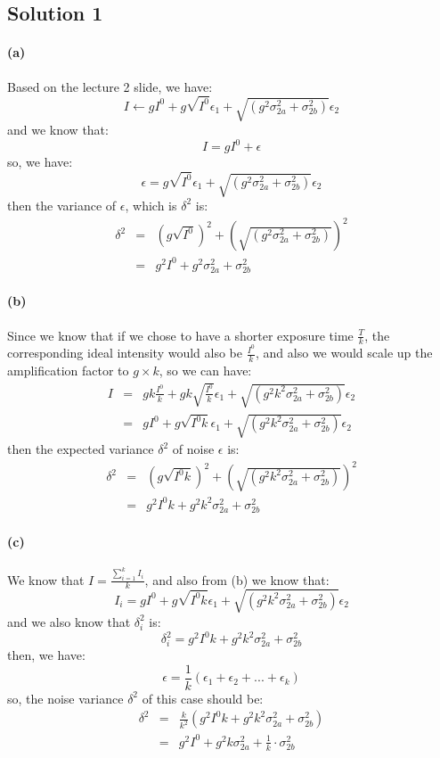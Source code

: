 \documentclass{article}
\newcommand{\solution}[1]{\clearpage \subsection*{Solution #1}}
\newcommand{\spart}[1]{\paragraph{(#1)}}
\begin{document}

\solution{1} 

\spart{a}Based on the lecture 2 slide, we have:
$$
I \leftarrow gI^0 + g\sqrt{I^0}\epsilon_1 + \sqrt{(g^2\sigma^2_{2a} + \sigma^2_{2b})}\epsilon_2
$$
and we know that:
$$
I = gI^0 + \epsilon
$$
so, we have:
$$
\epsilon= g\sqrt{I^0}\epsilon_1 + \sqrt{(g^2\sigma^2_{2a} + \sigma^2_{2b})}\epsilon_2
$$
then the variance of $\epsilon$, which is $\delta^2$ is:
\begin{eqnarray*}
\delta^2 & = & (g\sqrt{I^0})^2 + (\sqrt{(g^2\sigma^2_{2a} + \sigma^2_{2b})})^2 \\
              & = & g^2I^0 + g^2\sigma^2_{2a} + \sigma^2_{2b}
\end{eqnarray*}

\spart{b}Since we know that if we chose to have a shorter exposure time $\frac{T}{k}$, the corresponding ideal intensity would also be $\frac{I^0}{k}$, and also we would scale up the amplification factor to $g \times k$, so we can have:
\begin{eqnarray*}
I & = & gk\frac{I^0}{k} + gk\sqrt{\frac{I^0}{k}}\epsilon_1 + \sqrt{({g}^2{k}^2\sigma^2_{2a} + \sigma^2_{2b})}\epsilon_2 \\
  & = & gI^0 + g\sqrt{I^0k }\epsilon_1 + \sqrt{({g}^2{k}^2\sigma^2_{2a} + \sigma^2_{2b})}\epsilon_2
\end{eqnarray*}
then the expected variance $\delta^2$ of noise $\epsilon$ is:
\begin{eqnarray*}
\delta^2 & = & (g\sqrt{I^0k })^2 + (\sqrt{({g}^2{k}^2\sigma^2_{2a} + \sigma^2_{2b})})^2 \\
              & = & g^2I^0k + g^2k^2\sigma^2_{2a} + \sigma^2_{2b}
\end{eqnarray*}

\spart{c}We know that $I = \frac{\sum^k_{i=1}I_i}{k}$, and also from (b) we know that:
$$
I_i = gI^0 + g\sqrt{I^0k }\epsilon_1 + \sqrt{({g}^2{k}^2\sigma^2_{2a} + \sigma^2_{2b})}\epsilon_2
$$
and we also know that $\delta^2_i$ is:
$$
\delta^2_i = g^2I^0k + g^2k^2\sigma^2_{2a} + \sigma^2_{2b}
$$
then, we have:
$$
\epsilon = \frac{1}{k}(\epsilon_1 + \epsilon_2 +...+\epsilon_k)
$$
so, the noise variance $\delta^2$ of this case should be:
\begin{eqnarray*}
\delta^2 & = & \frac{k}{k^2}(g^2I^0k + g^2k^2\sigma^2_{2a} + \sigma^2_{2b}) \\
              & = & g^2I^0 + g^2k\sigma^2_{2a} + \frac{1}{k}\cdot\sigma^2_{2b}
\end{eqnarray*}
\end{document}
